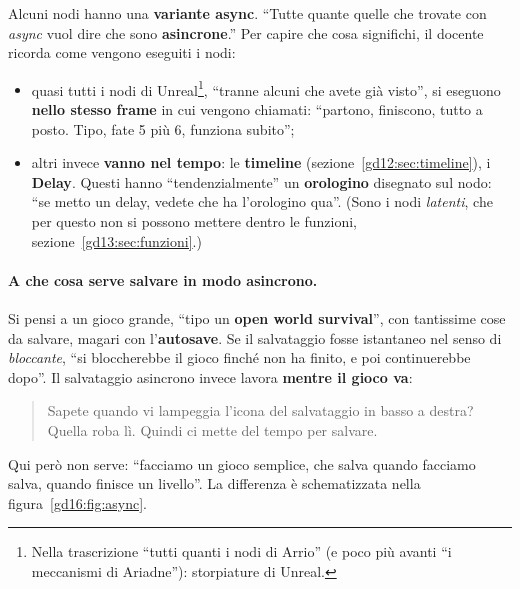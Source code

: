 Alcuni nodi hanno una \textbf{variante async}. ``Tutte quante quelle che trovate
con \emph{async} vuol dire che sono \textbf{asincrone}.'' Per capire che cosa
significhi, il docente ricorda come vengono eseguiti i nodi:
\begin{itemize}
  \item quasi tutti i nodi di Unreal\footnote{Nella trascrizione ``tutti quanti
        i nodi di Arrio'' (e poco più avanti ``i meccanismi di Ariadne''):
        storpiature di Unreal.}, ``tranne alcuni che avete già visto'', si
        eseguono \textbf{nello stesso frame} in cui vengono chiamati: ``partono,
        finiscono, tutto a posto. Tipo, fate 5 più 6, funziona subito'';
  \item altri invece \textbf{vanno nel tempo}: le \textbf{timeline}
        (sezione~\ref{gd12:sec:timeline}), i \textbf{Delay}. Questi hanno
        ``tendenzialmente'' un \textbf{orologino} disegnato sul nodo: ``se metto
        un delay, vedete che ha l'orologino qua''. (Sono i nodi
        \emph{latenti}, che per questo non si possono mettere dentro le
        funzioni, sezione~\ref{gd13:sec:funzioni}.)
\end{itemize}

\paragraph{A che cosa serve salvare in modo asincrono.} Si pensi a un gioco
grande, ``tipo un \textbf{open world survival}'', con tantissime cose da
salvare, magari con l'\textbf{autosave}. Se il salvataggio fosse istantaneo nel
senso di \emph{bloccante}, ``si bloccherebbe il gioco finché non ha finito, e
poi continuerebbe dopo''. Il salvataggio asincrono invece lavora \textbf{mentre
il gioco va}:
\begin{quote}
Sapete quando vi lampeggia l'icona del salvataggio in basso a destra? Quella
roba lì. Quindi ci mette del tempo per salvare.
\end{quote}
Qui però non serve: ``facciamo un gioco semplice, che salva quando facciamo
salva, quando finisce un livello''. La differenza è schematizzata nella
figura~\ref{gd16:fig:async}.

